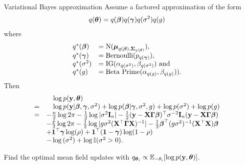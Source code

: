 \documentclass{beamer}
\begin{document}
\begin{frame}{Variational Bayes approximation}
Assume a factored approximation of the form
\begin{equation*}
q({\boldsymbol \theta}) = q({\boldsymbol \beta}) q({\boldsymbol \gamma}) q(\sigma^2) q(g)
\end{equation*}
where
\begin{equation*}
\begin{array}{ll}
q^*({\boldsymbol \beta}) &= \text{N}({\boldsymbol \mu}_{q({\boldsymbol \beta}), {\boldsymbol \Sigma}_{q({\boldsymbol \beta})}}), \\
q^*({\boldsymbol \gamma}) &= \text{Bernoulli}(p_{q({\boldsymbol \gamma})}), \\
q^*(\sigma^2) &= \text{IG}(\alpha_{q(\sigma^2)}, \beta_{q(\sigma^2)}) \text{ and } \\
q^*(g) &= \text{Beta Prime}(\alpha_{q(g)}, \beta_{q(g)})). \\
\end{array}
\end{equation*}
Then
\begin{equation*}
\begin{array}{rl}
&\quad \log{p({\bf y}, {\boldsymbol\theta})} \\
=& \quad \log{p({\bf y}| {\boldsymbol\beta}, {\boldsymbol\gamma}, \sigma^2)} + \log{p({\boldsymbol\beta}| {\boldsymbol\gamma}, \sigma^2, g)} + \log{p(\sigma^2)} + \log{p(g)} \\
=& -\frac{n}{2} \log{2 \pi} -\tfrac{1}{2} \log |\sigma^2 {\bf I}_n| - \tfrac{1}{2} ({\bf y} - {\bf X} {\boldsymbol{\Gamma}} {\boldsymbol \beta})^\top \sigma^{-2} {\bf I}_n ({\bf y} - {\bf X} {\boldsymbol{\Gamma}} {\boldsymbol \beta}) \\
& -\frac{p}{2} \log{2 \pi} - \tfrac{1}{2} \log |g \sigma^2 ({\bf X}^\top {\boldsymbol{\Gamma}} {\bf X})^{-1}| -
	\tfrac{1}{2} {\boldsymbol \beta}^\top (g \sigma^2)^{-1} ({\bf X}^\top {\bf X}) {\boldsymbol \beta} \\
& + {\bf 1}^\top {\boldsymbol\gamma} \log(\rho) + {\bf 1}^\top ({\bf 1} - {\boldsymbol \gamma}) \log(1 - \rho)\\
& - \log{(\sigma^2)} + \log {\mathbb I} (\sigma^2 > 0).
\end{array}
\end{equation*}

Find the optimal mean field updates with $q_{{\boldsymbol \theta}_i} \propto {\mathbb E}_{-\theta_i} [\log p({\bf y}, {\boldsymbol \theta})]$.

\end{frame}
\end{document}
